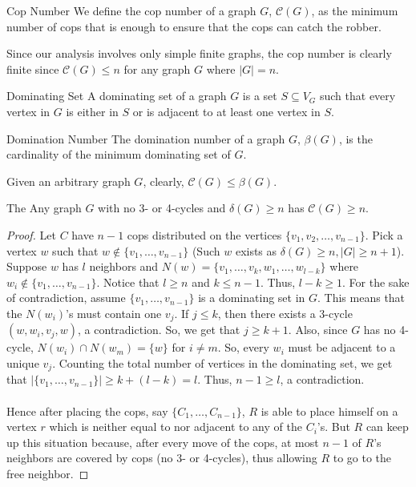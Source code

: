 \documentclass[12pt, a4paper]{article}
\begin{document}
\begin{definition}{Cop Number}{}
We define the cop number of a graph $G$, $\mathcal{C}(G)$, as the minimum number of cops that is enough to ensure that the cops can catch the robber.
\end{definition}

\begin{remark}{}{}
    Since our analysis involves only simple finite graphs, the cop number is clearly finite since $\mathcal{C}(G) \leq n$ for any graph $G$ where $|G| = n$.
\end{remark}

\begin{definition}{Dominating Set}{}
    A dominating set of a graph $G$ is a set $S \subseteq V_G$ such that every vertex in $G$ is either in $S$ or is adjacent to at least one vertex in $S$.
\end{definition}

\begin{definition}{Domination Number}{}
    The domination number of a graph $G$, $\beta(G)$, is the cardinality of the minimum dominating set of $G$.
\end{definition}

\begin{remark}{}{}
    Given an arbitrary graph $G$, clearly, $\mathcal{C}(G) \leq \beta(G)$.
\end{remark}

\begin{theorem}{}{The}
    Any graph $G$ with no 3- or 4-cycles and $\delta(G) \geq n$ has $\mathcal{C}(G) \geq n$.
\end{theorem}
\begin{proof}
    Let $C$ have $n - 1$ cops distributed on the vertices $\{v_1, v_2, \dots, v_{n-1}\}$. Pick a vertex $w$ such that $w \notin \{v_1, \dots, v_{n-1}\}$ (Such $w$ exists as $\delta(G) \geq n, |G| \geq n + 1$). Suppose $w$ has $l$ neighbors and $N(w) = \{v_1, \dots, v_k, w_1, \dots, w_{l-k}\}$ where $w_i \notin \{v_1, \dots, v_{n-1}\}$. Notice that $l \geq n$ and $k \leq n - 1$. Thus, $l - k \geq 1$. For the sake of contradiction, assume $\{v_1, \dots, v_{n - 1}\}$ is a dominating set in $G$. This means that the $N(w_i)$'s must contain one $v_j$. If $j \leq k$, then there exists a 3-cycle $(w, w_i, v_j, w)$, a contradiction. So, we get that $j \geq k + 1$. Also, since $G$ has no 4-cycle, $N(w_i) \cap N(w_m) = \{w\}$ for $i \neq m$. So, every $w_i$ must be adjacent to a unique $v_j$. Counting the total number of vertices in the dominating set, we get that $|\{v_1, \dots, v_{n - 1}\}| \geq k + (l - k) = l$. Thus, $n -1 \geq l$, a contradiction.\\\\
    Hence after placing the cops, say $\{C_1,\dots, C_{n-1}\}$, $R$ is able to place himself on a vertex $r$ which is neither equal to nor adjacent to any of the $C_i$'s. But $R$ can keep up this situation because, after every move of the cops, at most $n-1$ of $R$'s neighbors are covered by cops (no 3- or 4-cycles), thus allowing $R$ to go to the free neighbor. 
\end{proof}
\end{document}
